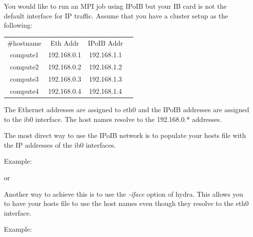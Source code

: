 You would like to run an MPI job using IPoIB but your IB card is not the
default interface for IP traffic.  Assume that you have a cluster setup as the
following:

\begin{table}[ht]
		\centering
		\begin{tabular}{c c c c}
				\#hostname & Eth Addr & IPoIB Addr \\ [0.5ex]
				compute1 & 192.168.0.1 & 192.168.1.1\\
				compute2 & 192.168.0.2 & 192.168.1.2\\
				compute3 & 192.168.0.3 & 192.168.1.3\\
				compute4 & 192.168.0.4 & 192.168.1.4\\
		\end{tabular}
		\label{table:verification1}
\end{table}

The Ethernet addresses are assigned to eth0 and the IPoIB addresses are
assigned to the ib0 interface.  The host names resolve to the 192.168.0.*
addresses.

The most direct way to use the IPoIB network is to populate your hosts file
with the IP addresses of the ib0 interfaces.

Example:



or


Another way to achieve this is to use the \emph{-iface} option of hydra.  This
allows you to have your hosts file to use the host names even though they
resolve to the eth0 interface.

Example:



